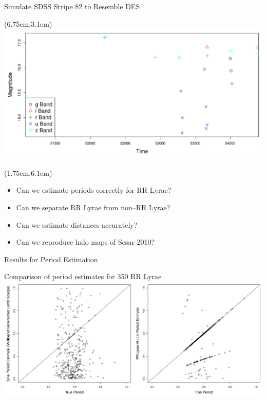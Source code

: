 \documentclass[12pt]{beamer}
\begin{document}
\begin{frame}{Simulate SDSS Stripe 82 to Resemble DES}
  \begin{textblock*}{3cm}(6.75cm,3.1cm) %
\includegraphics[scale=.15]{figs/unfolded_13350down.pdf}
\end{textblock*}

  \begin{textblock*}{12cm}(1.75cm,6.1cm) %
\begin{itemize}
\item Can we estimate periods correctly for RR Lyrae?
\item Can we separate RR Lyrae from non--RR Lyrae? 
\item Can we estimate distances accurately?
\item Can we reproduce halo maps of Sesar 2010?
\end{itemize}
\end{textblock*}

\end{frame}


\begin{frame}{Results for Period Estimation}



\begin{center}
Comparison of period estimates for 350 RR Lyrae\\
\includegraphics[scale=.25]{figs/period_comparison.pdf}
\end{center}



\end{frame}
\end{document}
